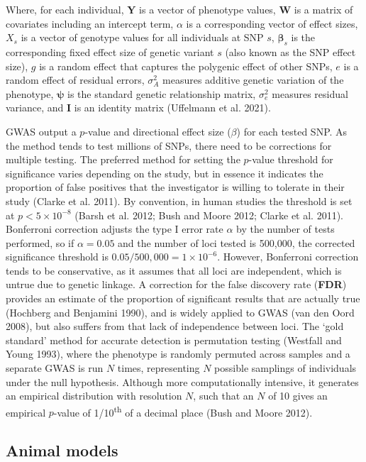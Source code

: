 \documentclass[
]{book}
\begin{document}
Where, for each individual, \(\textbf{Y}\) is a vector of phenotype values, \(\textbf{W}\) is a matrix of covariates including an intercept term, \(\alpha\) is a corresponding vector of effect sizes, \(X_s\) is a vector of genotype values for all individuals at SNP \(s\), \(\pmb{\beta}_s\) is the corresponding fixed effect size of genetic variant \(s\) (also known as the SNP effect size), \(g\) is a random effect that captures the polygenic effect of other SNPs, \(e\) is a random effect of residual errors, \(\sigma^2_{A}\) measures additive genetic variation of the phenotype, \(\pmb{\psi}\) is the standard genetic relationship matrix, \(\sigma^2_e\) measures residual variance, and \(\textbf{I}\) is an identity matrix (Uffelmann et al. 2021).

GWAS output a \(p\)-value and directional effect size (\(\beta\)) for each tested SNP. As the method tends to test millions of SNPs, there need to be corrections for multiple testing. The preferred method for setting the \(p\)-value threshold for significance varies depending on the study, but in essence it indicates the proportion of false positives that the investigator is willing to tolerate in their study (Clarke et al. 2011). By convention, in human studies the threshold is set at \(p < 5 \times 10^{-8}\) (Barsh et al. 2012; Bush and Moore 2012; Clarke et al. 2011). Bonferroni correction adjusts the type I error rate \(\alpha\) by the number of tests performed, so if \(\alpha = 0.05\) and the number of loci tested is 500,000, the corrected significance threshold is \(0.05 / 500,000 = 1\times10^{-6}\). However, Bonferroni correction tends to be conservative, as it assumes that all loci are independent, which is untrue due to genetic linkage. A correction for the false discovery rate (\textbf{FDR}) provides an estimate of the proportion of significant results that are actually true (Hochberg and Benjamini 1990), and is widely applied to GWAS (van den Oord 2008), but also suffers from that lack of independence between loci. The `gold standard' method for accurate detection is permutation testing (Westfall and Young 1993), where the phenotype is randomly permuted across samples and a separate GWAS is run \(N\) times, representing \(N\) possible samplings of individuals under the null hypothesis. Although more computationally intensive, it generates an empirical distribution with resolution \(N\), such that an \(N\) of 10 gives an empirical \(p\)-value of 1/10\textsuperscript{th} of a decimal place (Bush and Moore 2012).

\hypertarget{animal-models}{%
\subsection{Animal models}\label{animal-models}}
\end{document}
